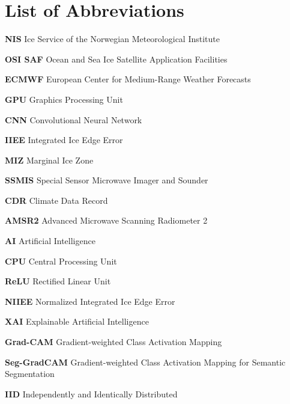 \documentclass[12pt]{article}
\begin{document}
\tableofcontents
\newpage

\listoffigures
\newpage

\listoftables
\newpage

\section*{List of Abbreviations}
\textbf{NIS} Ice Service of the Norwegian Meteorological Institute

\textbf{OSI SAF} Ocean and Sea Ice Satellite Application Facilities

\textbf{ECMWF} European Center for Medium-Range Weather Forecasts

\textbf{GPU} Graphics Processing Unit

\textbf{CNN} Convolutional Neural Network

\textbf{IIEE} Integrated Ice Edge Error

\textbf{MIZ} Marginal Ice Zone

\textbf{SSMIS} Special Sensor Microwave Imager and Sounder

\textbf{CDR} Climate Data Record

\textbf{AMSR2} Advanced Microwave Scanning Radiometer 2

\textbf{AI} Artificial Intelligence

\textbf{CPU} Central Processing Unit

\textbf{ReLU} Rectified Linear Unit

\textbf{NIIEE} Normalized Integrated Ice Edge Error

\textbf{XAI} Explainable Artificial Intelligence

\textbf{Grad-CAM} Gradient-weighted Class Activation Mapping

\textbf{Seg-GradCAM} Gradient-weighted Class Activation Mapping for Semantic Segmentation

\textbf{IID} Independently and Identically Distributed

\newpage


\newpage


\newpage


\newpage



\newpage


\newpage


\newpage


\newpage


\newpage

% 


\newpage
\appendix

\end{document}
